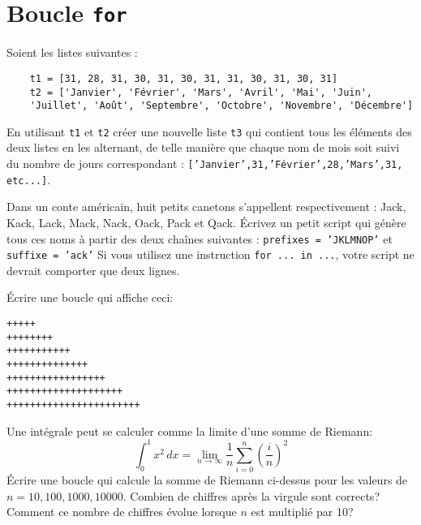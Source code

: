 
\section{Boucle \texttt{for}}


\begin{exercice}
Soient les listes suivantes :
\begin{verbatim}
    t1 = [31, 28, 31, 30, 31, 30, 31, 31, 30, 31, 30, 31]
    t2 = ['Janvier', 'Février', 'Mars', 'Avril', 'Mai', 'Juin',
    'Juillet', 'Août', 'Septembre', 'Octobre', 'Novembre', 'Décembre']
\end{verbatim}
En utilisant \texttt{t1} et \texttt{t2}
créer une nouvelle liste \texttt{t3} qui contient
tous les éléments des deux listes en les alternant, de telle manière
que chaque nom de mois soit suivi du nombre de jours correspondant :
\texttt{['Janvier',31,'Février',28,'Mars',31, etc...]}.
\end{exercice}

\begin{exercice}
Dans un conte américain, huit petits canetons s’appellent respectivement :
Jack, Kack, Lack, Mack, Nack, Oack, Pack et Qack. Écrivez un petit script qui
génère tous ces noms à partir des deux chaînes suivantes :
\texttt{prefixes = 'JKLMNOP'} et \texttt{suffixe = 'ack'}
Si vous utilisez une instruction \texttt{for ... in ...}, votre script ne devrait
comporter que deux lignes.
\end{exercice}

\begin{exercice}
Écrire une boucle qui affiche ceci:
{\footnotesize
\begin{verbatim}
+++++
++++++++
+++++++++++
++++++++++++++
+++++++++++++++++
++++++++++++++++++++
+++++++++++++++++++++++
\end{verbatim}
}
\end{exercice}

\begin{exercice}
    Une intégrale peut se calculer comme la limite d'une somme de Riemann:
    \[
	\int_0^1 x^2\,dx =
	\lim_{n\to\infty}\frac{1}{n}\sum_{i=0}^n{\left(\frac{i}{n}\right)^2}
    \]
    Écrire une boucle qui calcule la somme de Riemann ci-dessus pour les
    valeurs de $n=10, 100, 1000, 10000$. Combien de chiffres après la virgule
    sont corrects? Comment ce nombre de chiffres évolue lorsque $n$ est
    multiplié par 10?
\end{exercice}

